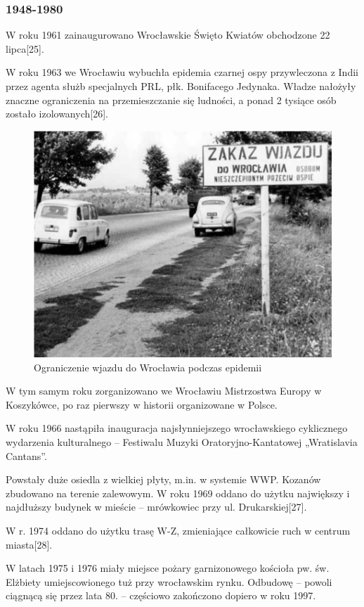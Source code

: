 \documentclass{article}
\begin{document}
\subsubsection{1948-1980}
W roku 1961 zainaugurowano Wrocławskie Święto Kwiatów obchodzone 22 lipca[25].

W roku 1963 we Wrocławiu wybuchła epidemia czarnej ospy przywleczona z Indii przez agenta służb specjalnych PRL, płk. Bonifacego Jedynaka. Władze nałożyły znaczne ograniczenia na przemieszczanie się ludności, a ponad 2 tysiące osób zostało izolowanych[26].
 \begin{figure}[h!]
\centering
\includegraphics[scale=0.3]{18.png}
\caption{Ograniczenie wjazdu do Wrocławia podczas epidemii}
\end{figure}

W tym samym roku zorganizowano we Wrocławiu Mistrzostwa Europy w Koszykówce, po raz pierwszy w historii organizowane w Polsce.

W roku 1966 nastąpiła inauguracja najsłynniejszego wrocławskiego cyklicznego wydarzenia kulturalnego – Festiwalu Muzyki Oratoryjno-Kantatowej „Wratislavia Cantans”.

Powstały duże osiedla z wielkiej płyty, m.in. w systemie WWP. Kozanów zbudowano na terenie zalewowym. W roku 1969 oddano do użytku największy i najdłuższy budynek w mieście – mrówkowiec przy ul. Drukarskiej[27].

W r. 1974 oddano do użytku trasę W-Z, zmieniające całkowicie ruch w centrum miasta[28].

W latach 1975 i 1976 miały miejsce pożary garnizonowego kościoła pw. św. Elżbiety umiejscowionego tuż przy wrocławskim rynku. Odbudowę – powoli ciągnącą się przez lata 80. – częściowo zakończono dopiero w roku 1997.
\end{document}
